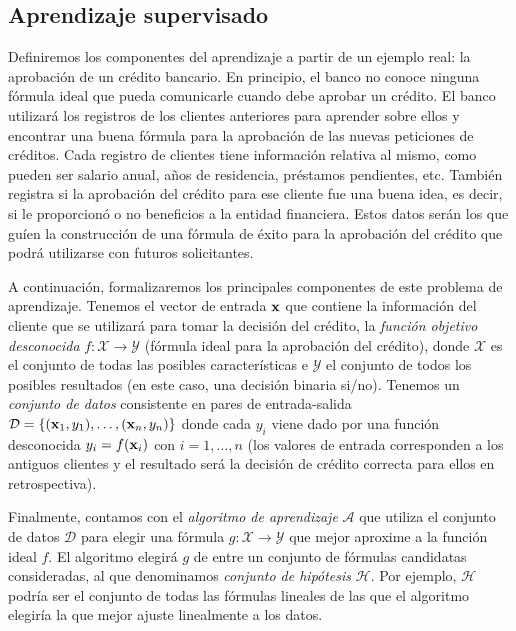 \documentclass[oneside,openright,titlepage,numbers=noenddot,openany,headinclude,footinclude=true,
cleardoublepage=empty,abstractoff,BCOR=5mm,paper=a4,fontsize=12pt,main=spanish]{scrreprt}
\begin{document}
\subsection{Aprendizaje supervisado} \label{subsec:ejemplobanco}

Definiremos los componentes del aprendizaje a partir de un ejemplo real: la aprobación de un crédito bancario. En principio, el banco no conoce ninguna fórmula ideal que pueda comunicarle cuando debe aprobar un crédito. El banco utilizará los registros de los clientes anteriores para aprender sobre ellos y encontrar una buena fórmula para la aprobación de las nuevas peticiones de créditos. Cada registro de clientes tiene información relativa al mismo, como pueden ser salario anual, años de residencia, préstamos pendientes, etc. También registra si la aprobación del crédito para ese cliente fue una buena idea, es decir, si le proporcionó o no beneficios a la entidad financiera. Estos datos serán los que guíen la construcción de una fórmula de éxito para la aprobación del crédito que podrá utilizarse con futuros solicitantes.

A continuación, formalizaremos los principales componentes de este problema de aprendizaje. Tenemos el vector de entrada $\textbf{x}$ que contiene la información del cliente que se utilizará para tomar la decisión del crédito, la \textit{función objetivo desconocida} $f\colon \mathcal{X}\to \mathcal{Y}$ (fórmula ideal para la aprobación del crédito), donde $\mathcal{X}$ es el conjunto de todas las posibles características e $\mathcal{Y}$ el conjunto de todos los posibles resultados (en este caso, una decisión binaria si/no). Tenemos un \textit{conjunto de datos} consistente en pares de entrada-salida $\mathcal{D}=\{(\textbf{x}_1,y_1),\dots,(\textbf{x}_n,y_n)\}$ donde cada  $y_i$ viene dado por una función desconocida $y_i=f(\textbf{x}_i)$ con $i=1,\dots,n$ (los valores de entrada corresponden a los antiguos clientes y el resultado será la decisión de crédito correcta para ellos en retrospectiva).

Finalmente, contamos con el \textit{algoritmo de aprendizaje} $\mathcal{A}$ que utiliza el conjunto de datos $\mathcal{D}$ para elegir una fórmula $g\colon \mathcal{X}\to \mathcal{Y}$ que mejor aproxime a la función ideal $f$. El algoritmo elegirá $g$ de entre un conjunto de fórmulas candidatas consideradas, al que denominamos \textit{conjunto de hipótesis} $\mathcal{H}$. Por ejemplo, $\mathcal{H}$ podría ser el conjunto de todas las fórmulas lineales de las que el algoritmo elegiría la que mejor ajuste linealmente a los datos.\\
\end{document}

